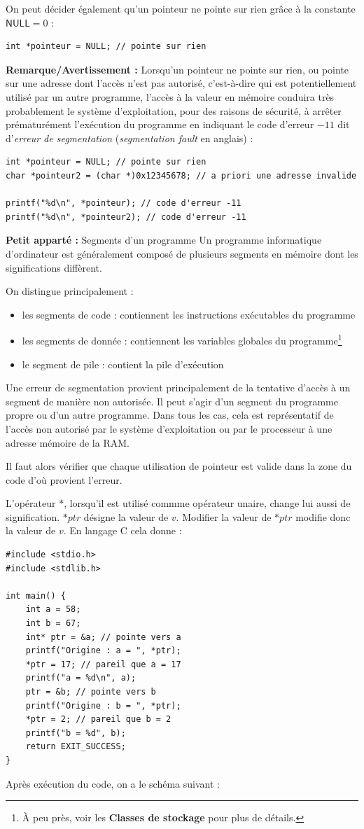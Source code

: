 \documentclass[../../../main.tex]{subfiles}
\begin{document}
On peut décider également qu'un pointeur ne pointe sur rien grâce à la constante $\textsf{NULL} = 0$ :
\begin{verbatim}
int *pointeur = NULL; // pointe sur rien
\end{verbatim}
\textbf{Remarque/Avertissement :} Lorsqu'un pointeur ne pointe sur rien, ou pointe sur une adresse dont l'accès n'est pas autorisé, c'est-à-dire qui est potentiellement utilisé par un autre programme, l'accès à la valeur en mémoire conduira très probablement le système d'exploitation, pour des raisons de sécurité, à arrêter prématurément l'exécution du programme en indiquant le code d'erreur $-11$ dit d'\textit{erreur de segmentation} (\textit{segmentation fault} en anglais) :
\begin{verbatim}
int *pointeur = NULL; // pointe sur rien
char *pointeur2 = (char *)0x12345678; // a priori une adresse invalide 

printf("%d\n", *pointeur); // code d'erreur -11
printf("%d\n", *pointeur2); // code d'erreur -11
\end{verbatim}
\begin{minitelbasicbox}{\textbf{Petit apparté :} Segments d'un programme}
Un programme informatique d'ordinateur est généralement composé de plusieurs segments en mémoire dont les significations diffèrent.

On distingue principalement :
\begin{itemize}
	\item les segments de code : contiennent les instructions exécutables du programme
	\item les segments de donnée : contiennent les variables globales du programme\footnote{À peu près, voir les \textbf{Classes de stockage} pour plus de détails.}
	\item le segment de pile : contient la pile d'exécution
\end{itemize}
Une erreur de segmentation provient principalement de la tentative d'accès à un segment de manière non autorisée. Il peut s'agir d'un segment du programme propre ou d'un autre programme. Dans tous les cas, cela est représentatif de l'accès non autorisé par le système d'exploitation ou par le processeur à une adresse mémoire de la RAM.

Il faut alors vérifier que chaque utilisation de pointeur est valide dans la zone du code d'où provient l'erreur.
\end{minitelbasicbox}

L'opérateur $*$, lorsqu'il est utilisé commme opérateur unaire, change lui aussi de signification. $*ptr$ désigne la valeur de $v$. Modifier la valeur de $*ptr$ modifie donc la valeur de $v$. En langage C cela donne :
\begin{verbatim}
#include <stdio.h>
#include <stdlib.h>

int main() {
	int a = 58;
	int b = 67;
	int* ptr = &a; // pointe vers a
	printf("Origine : a = ", *ptr);
	*ptr = 17; // pareil que a = 17
	printf("a = %d\n", a);
	ptr = &b; // pointe vers b
	printf("Origine : b = ", *ptr);
	*ptr = 2; // pareil que b = 2
	printf("b = %d", b);
	return EXIT_SUCCESS;
}
\end{verbatim}
Après exécution du code, on a le schéma suivant :
\end{document}
